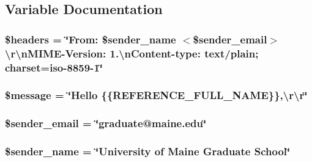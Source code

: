 \subsection{Variable Documentation}
\hypertarget{reference_request_8email_8php_a52500036ee807241b8b4b7e2367c49ef}{
\subsubsection[{\$headers}]{\setlength{\rightskip}{0pt plus 5cm}\$headers = \char`\"{}From\-: \$sender\-\_\-name $<$\$sender\-\_\-email$>$\textbackslash{}r\textbackslash{}n\-M\-I\-M\-E-\/Version\-: 1.\textbackslash{}n\-Content-\/type\-: text/plain; charset=iso-\/8859-\/1\char`\"{}}}\label{reference_request_8email_8php_a52500036ee807241b8b4b7e2367c49ef}
\hypertarget{reference_request_8email_8php_abf17cb2dba2ed17cb28aa5f37deb5293}{
\subsubsection[{\$message}]{\setlength{\rightskip}{0pt plus 5cm}\$message = \char`\"{}Hello \{\{R\-E\-F\-E\-R\-E\-N\-C\-E\-\_\-\-F\-U\-L\-L\-\_\-\-N\-A\-M\-E\}\},\textbackslash{}r\textbackslash{}r\char`\"{}}}\label{reference_request_8email_8php_abf17cb2dba2ed17cb28aa5f37deb5293}
\hypertarget{reference_request_8email_8php_aa1dd1e27206dc4fd57800391ff4bb7de}{
\subsubsection[{\$sender\-\_\-email}]{\setlength{\rightskip}{0pt plus 5cm}\$sender\-\_\-email = \char`\"{}graduate@maine.\-edu\char`\"{}}}\label{reference_request_8email_8php_aa1dd1e27206dc4fd57800391ff4bb7de}
\hypertarget{reference_request_8email_8php_a764139b835e0e51ceb5518c72938995e}{
\subsubsection[{\$sender\-\_\-name}]{\setlength{\rightskip}{0pt plus 5cm}\$sender\-\_\-name = \char`\"{}University of Maine Graduate School\char`\"{}}}\label{reference_request_8email_8php_a764139b835e0e51ceb5518c72938995e}
